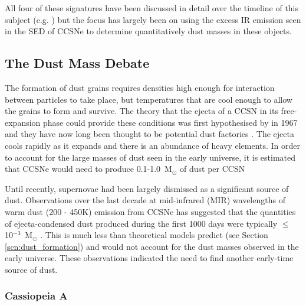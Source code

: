\noindent All four of these signatures have been discussed in detail over the timeline of this subject (e.g. \citet{Gomez2013}) but the focus has largely been on using the excess IR emission seen in the SED of CCSNe to determine quantitatively dust masses in these objects.  
 

\subsection{The Dust Mass Debate}

The formation of dust grains requires densities high enough for interaction between particles to take place, but temperatures that are cool enough to allow the grains to form and survive.  The theory that the ejecta of a CCSN in its free-expansion phase could provide these conditions  was first hypothesised by \citeauthor{Cernuschi1967} in 1967 and they have now long been thought to be potential dust factories \citep{Hoyle1970, Kozasa1991, Todini2001,Nozawa2003}.  The ejecta cools rapidly as it expands and there is an abundance of heavy elements.  In order to account for the large masses of dust seen in the early universe, it is estimated that CCSNe would need to produce  0.1-1.0~M$_\odot$ of dust per CCSN  \citep{Morgan2003, Dwek2007}

Until recently, supernovae had been largely dismissed as a significant source of dust.  Observations over the last decade at mid-infrared (MIR) wavelengths of warm dust (200 - 450K) emission from CCSNe has suggested that the quantities of ejecta-condensed dust produced during the first 1000 days were typically $\leq$ 10$^{-3}$~M$_\odot$  \citep{Sugerman2006, Meikle2007, Kotak2009, Andrews2010, Fabbri2011}.  This is much less than theoretical models predict (see Section \ref{scn:dust_formation}) and would not account for the dust masses observed in the early universe.  These observations indicated the need to find another early-time source of dust.

\subsubsection{Cassiopeia A}

